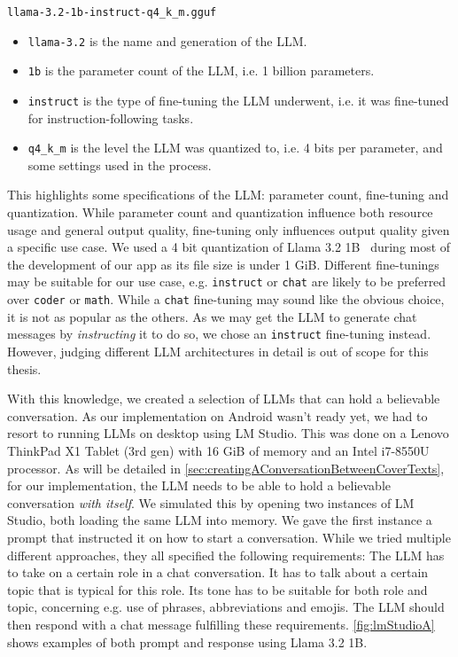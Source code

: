 \begin{center}
	\lstinline|llama-3.2-1b-instruct-q4_k_m.gguf|
\end{center}

\begin{itemize}
	\item \lstinline|llama-3.2| is the name and generation of the \gls{LLM}.
	\item \lstinline|1b| is the parameter count of the \gls{LLM}, i.e. 1 billion parameters.
	\item \lstinline|instruct| is the type of fine-tuning the \gls{LLM} underwent, i.e. it was fine-tuned for instruction-following tasks.
	\item \lstinline|q4_k_m| is the level the \gls{LLM} was quantized to, i.e. 4 bits per parameter, and some settings used in the process.
\end{itemize}

This highlights some specifications of the \gls{LLM}: parameter count, fine-tuning and quantization. While parameter count and quantization influence both resource usage and general output quality, fine-tuning only influences output quality given a specific use case. We used a 4 bit quantization of Llama 3.2 1B~\cite{huggingquantsHuggingquantsLlama321BInstructQ4_K_MGGUFHugging2024} during most of the development of our app as its file size is under 1 GiB. Different fine-tunings may be suitable for our use case, e.g. \lstinline|instruct| or \lstinline|chat| are likely to be preferred over \lstinline|coder| or \lstinline|math|. While a \lstinline|chat| fine-tuning may sound like the obvious choice, it is not as popular as the others. As we may get the \gls{LLM} to generate chat messages by \textit{instructing} it to do so, we chose an \lstinline|instruct| fine-tuning instead. However, judging different \gls{LLM} architectures in detail is out of scope for this thesis.

With this knowledge, we created a selection of \glspl{LLM} that can hold a believable conversation. As our implementation on Android wasn't ready yet, we had to resort to running \glspl{LLM} on desktop using LM Studio. This was done on a Lenovo ThinkPad X1 Tablet (3rd gen) with 16 GiB of memory and an Intel i7-8550U processor. As will be detailed in \cref{sec:creatingAConversationBetweenCoverTexts}, for our implementation, the \gls{LLM} needs to be able to hold a believable conversation \textit{with itself}. We simulated this by opening two instances of LM Studio, both loading the same \gls{LLM} into memory. We gave the first instance a prompt that instructed it on how to start a conversation. While we tried multiple different approaches, they all specified the following requirements: The \gls{LLM} has to take on a certain role in a chat conversation. It has to talk about a certain topic that is typical for this role. Its tone has to be suitable for both role and topic, concerning e.g. use of phrases, abbreviations and emojis. The \gls{LLM} should then respond with a chat message fulfilling these requirements. \cref{fig:lmStudioA} shows examples of both prompt and response using Llama 3.2 1B.

